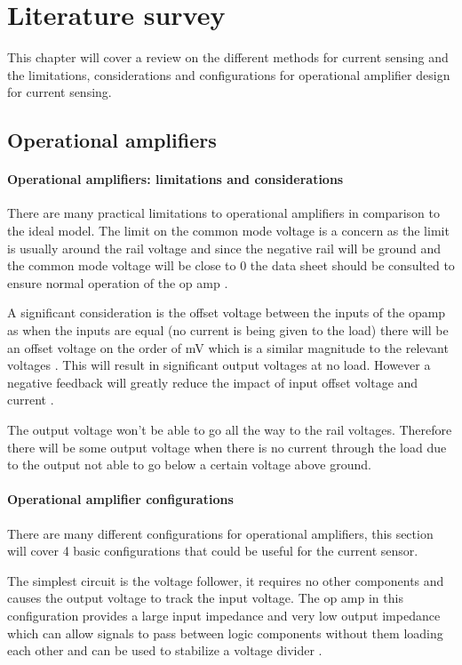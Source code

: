 \chapter{Literature survey}\label{chap:Lit}

This chapter will cover a review on the different methods for current sensing and the limitations, considerations and configurations for operational amplifier design for current sensing. 

\section{Operational amplifiers}\label{sec:opamps}

\subsubsection{Operational amplifiers: limitations and considerations}\label{sec:opamps_limits}
There are many practical limitations to operational amplifiers in comparison to the ideal model. The limit on the common mode voltage is a concern as the limit is usually around the rail voltage and since the negative rail will be ground and the common mode voltage will be close to 0 the data sheet should be consulted to ensure normal operation of the op amp \cite{NonIdeal_Opamps}. 

A significant consideration is the offset voltage between the inputs of the opamp as when the inputs are equal (no current is being given to the load) there will be an offset voltage on the order of mV which is a similar magnitude to the relevant voltages \cite{Lim_Opamps}. This will result in significant output voltages at no load. However a negative feedback will greatly reduce the impact of input offset voltage and current \cite{Lim_Opamps}.

The output voltage won't be able to go all the way to the rail voltages. Therefore there will be some output voltage when there is no current through the load due to the output not able to go below a certain voltage above ground.
\subsubsection{Operational amplifier configurations}\label{sec:opamps_configs}
There are many different configurations for operational amplifiers, this section will cover 4 basic configurations that could be useful for the current sensor.

The simplest circuit is the voltage follower, it requires no other components and causes the output voltage to track the input voltage. The op amp in this configuration provides a large input impedance and very low output impedance which can allow signals to pass between logic components without them loading each other and can be used to stabilize a voltage divider \cite{Fund_Opamps}.

